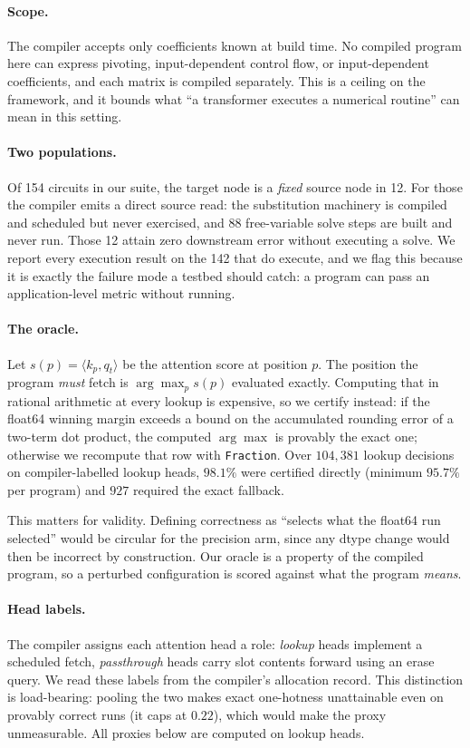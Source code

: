 \documentclass{article}
\theoremstyle{definition}
\begin{document}
\paragraph{Scope.} The compiler accepts only coefficients known at build time.
No compiled program here can express pivoting, input-dependent control flow, or
input-dependent coefficients, and each matrix is compiled separately. This is a
ceiling on the framework, and it bounds what ``a transformer executes a numerical
routine'' can mean in this setting.

\paragraph{Two populations.} Of 154 circuits in our suite, the target node is a
\emph{fixed} source node in 12. For those the compiler emits a direct source
read: the substitution machinery is compiled and scheduled but never exercised,
and 88 free-variable solve steps are built and never run. Those 12 attain zero
downstream error without executing a solve. We report every execution result on
the 142 that do execute, and we flag this because it is exactly the failure mode
a testbed should catch: a program can pass an application-level metric without
running.

\paragraph{The oracle.} Let $s(p)=\langle k_p, q_t\rangle$ be the attention score
at position $p$. The position the program \emph{must} fetch is
$\arg\max_p s(p)$ evaluated exactly. Computing that in rational arithmetic at
every lookup is expensive, so we certify instead: if the float64 winning margin
exceeds a bound on the accumulated rounding error of a two-term dot product, the
computed $\arg\max$ is provably the exact one; otherwise we recompute that row
with \texttt{Fraction}. Over $104{,}381$ lookup decisions on compiler-labelled
lookup heads, $98.1\%$ were certified directly (minimum $95.7\%$ per program) and
$927$ required the exact fallback.

This matters for validity. Defining correctness as ``selects what the float64 run
selected'' would be circular for the precision arm, since any dtype change would
then be incorrect by construction. Our oracle is a property of the compiled
program, so a perturbed configuration is scored against what the program
\emph{means}.

\paragraph{Head labels.} The compiler assigns each attention head a role:
\emph{lookup} heads implement a scheduled fetch, \emph{passthrough} heads carry
slot contents forward using an erase query. We read these labels from the
compiler's allocation record. This distinction is load-bearing: pooling the two
makes exact one-hotness unattainable even on provably correct runs (it caps at
$0.22$), which would make the proxy unmeasurable. All proxies below are computed
on lookup heads.
\end{document}
